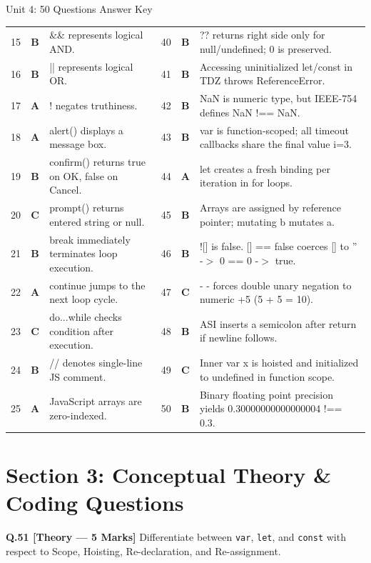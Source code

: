 \begin{answerkeytable}{Unit 4: 50 Questions Answer Key}
\begin{tabularx}{\textwidth}{l c X l c X}
15 & \textbf{B} & \&\& represents logical AND. & 40 & \textbf{B} & ?? returns right side only for null/undefined; 0 is preserved. \\
16 & \textbf{B} & || represents logical OR. & 41 & \textbf{B} & Accessing uninitialized let/const in TDZ throws ReferenceError. \\
17 & \textbf{A} & ! negates truthiness. & 42 & \textbf{B} & NaN is numeric type, but IEEE-754 defines NaN !== NaN. \\
18 & \textbf{A} & alert() displays a message box. & 43 & \textbf{B} & var is function-scoped; all timeout callbacks share the final value i=3. \\
19 & \textbf{B} & confirm() returns true on OK, false on Cancel. & 44 & \textbf{A} & let creates a fresh binding per iteration in for loops. \\
20 & \textbf{C} & prompt() returns entered string or null. & 45 & \textbf{B} & Arrays are assigned by reference pointer; mutating b mutates a. \\
21 & \textbf{B} & break immediately terminates loop execution. & 46 & \textbf{B} & ![] is false. [] == false coerces [] to '' -$>$ 0 == 0 -$>$ true. \\
22 & \textbf{A} & continue jumps to the next loop cycle. & 47 & \textbf{C} & - - forces double unary negation to numeric +5 (5 + 5 = 10). \\
23 & \textbf{C} & do...while checks condition after execution. & 48 & \textbf{B} & ASI inserts a semicolon after return if newline follows. \\
24 & \textbf{B} & // denotes single-line JS comment. & 49 & \textbf{C} & Inner var x is hoisted and initialized to undefined in function scope. \\
25 & \textbf{A} & JavaScript arrays are zero-indexed. & 50 & \textbf{B} & Binary floating point precision yields 0.30000000000000004 !== 0.3. \\
\bottomrule
\end{tabularx}
\end{answerkeytable}

\section{Section 3: Conceptual Theory \& Coding Questions}
\noindent\textbf{Q.51 [Theory --- 5 Marks]} Differentiate between \texttt{var}, \texttt{let}, and \texttt{const} with respect to Scope, Hoisting, Re-declaration, and Re-assignment.

